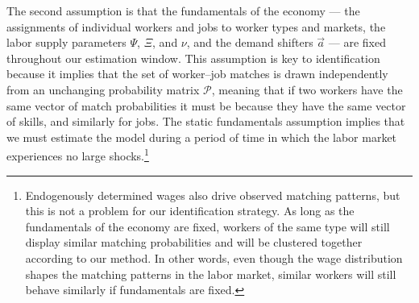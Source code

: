 \documentclass[12pt]{article}
\theoremstyle{definition}
\theoremstyle{plain}
\begin{document}
The second assumption is that the fundamentals of the economy --- the assignments of individual workers and jobs to worker types and markets, the labor supply parameters $\Psi$, $\Xi$, and $\nu$, and the demand shifters $\vec{a}$ --- are fixed throughout our estimation window. This assumption is key to identification because it implies that the set of worker--job matches is drawn independently from an unchanging probability matrix $\mathcal{P}$, meaning that if two workers have the same vector of match probabilities it must be because they have the same vector of skills, and similarly for jobs. The static fundamentals assumption implies that we must estimate the model during a period of time in which the labor market experiences no large shocks.\footnote{Endogenously determined wages also drive observed matching patterns, but this is not a problem for our identification strategy. As long as the fundamentals of the economy are fixed, workers of the same type will still display similar matching probabilities and will be clustered together according to our method. In other words, even though the wage distribution shapes the matching patterns in the labor market, similar workers will still behave similarly if fundamentals are fixed.}

\end{document}
